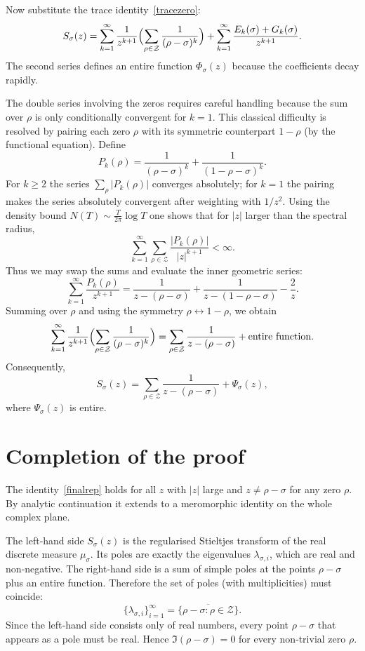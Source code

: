 \documentclass[11pt,a4paper]{article}
\theoremstyle{definition}
\newcommand{\Z}{\mathcal{Z}}  %
\begin{document}
Now substitute the trace identity~\eqref{tracezero}:
\[
S_\sigma(z) = \sum_{k=1}^\infty \frac{1}{z^{k+1}} \Bigl( \sum_{\rho \in \Z} \frac{1}{(\rho-\sigma)^k} \Bigr)
            + \sum_{k=1}^\infty \frac{E_k(\sigma) + G_k(\sigma)}{z^{k+1}}.
\]
The second series defines an entire function \(\Phi_\sigma(z)\) because the coefficients decay rapidly.

The double series involving the zeros requires careful handling because the sum over \(\rho\) is only conditionally convergent for \(k=1\).
This classical difficulty is resolved by pairing each zero \(\rho\) with its symmetric counterpart \(1-\rho\) (by the functional equation).
Define
\[
P_k(\rho) = \frac{1}{(\rho-\sigma)^k} + \frac{1}{(1-\rho-\sigma)^k}.
\]
For \(k \ge 2\) the series \(\sum_\rho |P_k(\rho)|\) converges absolutely; for \(k=1\) the pairing makes the series absolutely convergent after weighting with \(1/z^2\).
Using the density bound \(N(T) \sim \frac{T}{2\pi}\log T\) one shows that for \(|z|\) larger than the spectral radius,
\[
\sum_{k=1}^\infty \sum_{\rho \in \Z} \frac{|P_k(\rho)|}{|z|^{k+1}} < \infty.
\]
Thus we may swap the sums and evaluate the inner geometric series:
\[
\sum_{k=1}^\infty \frac{P_k(\rho)}{z^{k+1}}
= \frac{1}{z-(\rho-\sigma)} + \frac{1}{z-(1-\rho-\sigma)} - \frac{2}{z}.
\]
Summing over \(\rho\) and using the symmetry \(\rho \leftrightarrow 1-\rho\), we obtain
\[
\sum_{k=1}^\infty \frac{1}{z^{k+1}} \Bigl( \sum_{\rho \in \Z} \frac{1}{(\rho-\sigma)^k} \Bigr)
= \sum_{\rho \in \Z} \frac{1}{z-(\rho-\sigma)} + \text{entire function}.
\]
Consequently,
\begin{equation}\label{finalrep}
S_\sigma(z) = \sum_{\rho \in \Z} \frac{1}{z-(\rho-\sigma)} + \Psi_\sigma(z),
\end{equation}
where \(\Psi_\sigma(z)\) is entire.

\section{Completion of the proof}
The identity~\eqref{finalrep} holds for all \(z\) with \(|z|\) large and \(z \neq \rho-\sigma\) for any zero \(\rho\).
By analytic continuation it extends to a meromorphic identity on the whole complex plane.

The left‑hand side \(S_\sigma(z)\) is the regularised Stieltjes transform of the real discrete measure \(\mu_\sigma\).
Its poles are exactly the eigenvalues \(\lambda_{\sigma,i}\), which are real and non‑negative.
The right‑hand side is a sum of simple poles at the points \(\rho-\sigma\) plus an entire function.
Therefore the set of poles (with multiplicities) must coincide:
\[
\{ \lambda_{\sigma,i} \}_{i=1}^\infty = \overline{\{ \rho-\sigma : \rho \in \Z \}}.
\]
Since the left‑hand side consists only of real numbers, every point \(\rho-\sigma\) that appears as a pole must be real.
Hence \(\Im (\rho-\sigma) = 0\) for every non‑trivial zero \(\rho\).
\end{document}
